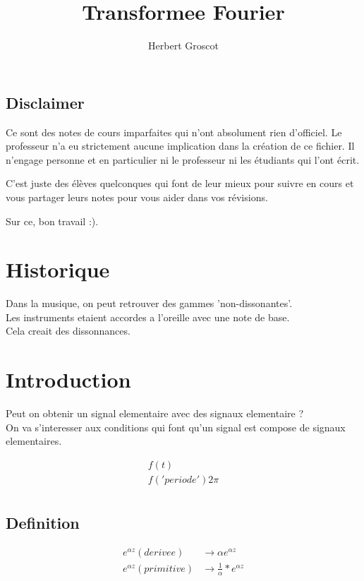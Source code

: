 \documentclass[a4paper,11pt]{article}
\title{Transformee Fourier}
\author{Herbert Groscot}
\begin{document}
\maketitle
\subsection*{Disclaimer}

Ce sont des notes de cours imparfaites qui n'ont absolument rien d'officiel.
Le professeur n'a eu strictement aucune implication dans la création de ce
fichier. Il n'engage personne et en particulier ni le professeur ni les
étudiants qui l'ont écrit.

C'est juste des élèves quelconques qui font de leur mieux pour suivre en cours
et vous partager leurs notes pour vous aider dans vos révisions.

Sur ce, bon travail :).

\tableofcontents
\newpage

\section{Historique}

Dans la musique, on peut retrouver des gammes 'non-dissonantes'.\\
Les instruments etaient accordes a l'oreille avec une note de base.\\
Cela creait des dissonnances.\\

\section{Introduction}
Peut on obtenir un signal elementaire avec des signaux elementaire ?\\

On va s'interesser aux conditions qui font qu'un signal est compose de signaux elementaires.

\begin{align*}
f(t)  \\
        f   ('periode')  2\pi \\
\end{align*}

\subsection{Definition}

\begin{align*}
  e^{\alpha z}   (derivee) &\rightarrow \alpha e^{\alpha z}\\
  e^{\alpha z} (primitive) &\rightarrow \frac{1}{\alpha} * e^{\alpha z}\\
\end{align*}
\end{document}
